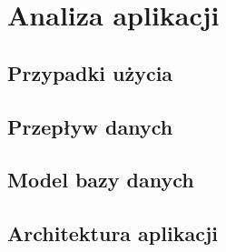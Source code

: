 \chapter{Analiza aplikacji}
\label{cha:analizaAplikacji}

\section{Przypadki użycia}
\label{sec:przypadkiUzycia}

\section{Przepływ danych}
\label{sec:przeplywDanych}

\section{Model bazy danych}
\label{sec;modelBazyDanych}

\section{Architektura aplikacji}
\label{sec:architektura}
